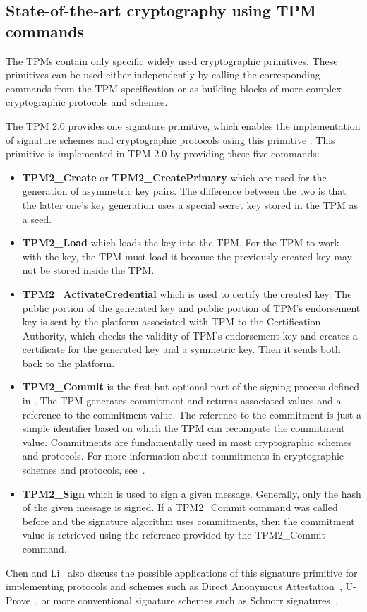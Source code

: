 \subsection{State-of-the-art cryptography using TPM commands}\label{sec:soacryptotpmcommands}
The TPMs contain only specific widely used cryptographic primitives. These primitives can be used either independently by calling the corresponding commands from the TPM specification or as building blocks of more complex cryptographic protocols and schemes. 

The TPM 2.0 provides one signature primitive, which enables the implementation of signature schemes and cryptographic protocols using this primitive \cite{chen2013flexible}. This primitive is implemented in TPM 2.0 by providing these five commands:
\begin{itemize}
    \item \textbf{TPM2\_Create} or \textbf{TPM2\_CreatePrimary} which are used for the generation of asymmetric key pairs. The difference between the two is that the latter one's key generation uses a special secret key stored in the TPM as a seed.
    \item \textbf{TPM2\_Load} which loads the key into the TPM. For the TPM to work with the key, the TPM must load it because the previously created key may not be stored inside the TPM.
    \item \textbf{TPM2\_ActivateCredential} which is used to certify the created key. The public portion of the generated key and public portion of TPM's endorsement key is sent by the platform associated with TPM to the Certification Authority, which checks the validity of TPM's endorsement key and creates a certificate for the generated key and a symmetric key. Then it sends both back to the platform.
    \item \textbf{TPM2\_Commit} is the first but optional part of the signing process defined in \cite{chen2013flexible}. The TPM generates commitment and returns associated values and a reference to the commitment value. The reference to the commitment is just a simple identifier based on which the TPM can recompute the commitment value. Commitments are fundamentally used in most cryptographic schemes and protocols. For more information about commitments in cryptographic schemes and protocols, see~\cite{damgaard1998commitment}. 
    \item \textbf{TPM2\_Sign} which is used to sign a given message. Generally, only the hash of the given message is signed. If a TPM2\_Commit command was called before and the signature algorithm uses commitments, then the commitment value is retrieved using the reference provided by the TPM2\_Commit command.
\end{itemize}
Chen and Li~\cite{chen2013flexible} also discuss the possible applications of this signature primitive for implementing protocols and schemes such as Direct Anonymous Attestation~\cite{daaSpec}, U-Prove~\cite{uproveSpec}, or more conventional signature schemes such as Schnorr signatures~\cite{schnorrSpec}. 

